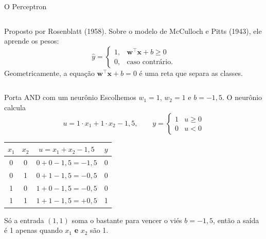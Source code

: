 \documentclass[10pt]{beamer}
\begin{document}
\begin{frame}{O Perceptron}
\begin{columns}[c]
Proposto por Rosenblatt (1958). Sobre o modelo de McCulloch e Pitts (1943), ele aprende os pesos:
\[ \hat{y}=\begin{cases}1,& \mathbf{w}^\top\mathbf{x}+b\ge0\\0,&\text{caso contrário.}\end{cases} \]
Geometricamente, a equação $\mathbf{w}^\top\mathbf{x}+b=0$ é uma reta que separa as classes.
\end{columns}
\end{frame}

\begin{frame}{Porta AND com um neurônio}
Escolhemos $w_1=1$, $w_2=1$ e $b=-1{,}5$. O neurônio calcula
\[ u = 1\cdot x_1 + 1\cdot x_2 - 1{,}5, \qquad y=\begin{cases}1 & u\ge 0\\ 0 & u<0\end{cases} \]
\begin{center}
\begin{tabular}{@{}cc|c|c@{}}
\toprule
$x_1$ & $x_2$ & $u = x_1 + x_2 - 1{,}5$ & $y$ \\
\midrule
0 & 0 & $0+0-1{,}5=-1{,}5$ & 0 \\
0 & 1 & $0+1-1{,}5=-0{,}5$ & 0 \\
1 & 0 & $1+0-1{,}5=-0{,}5$ & 0 \\
1 & 1 & $1+1-1{,}5=+0{,}5$ & 1 \\
\bottomrule
\end{tabular}
\end{center}
Só a entrada $(1,1)$ soma o bastante para vencer o viés $b=-1{,}5$, então a saída é 1 apenas quando $x_1$ \textbf{e} $x_2$ são 1.
\end{frame}
\end{document}
